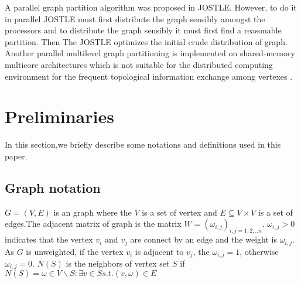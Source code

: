 \documentclass{acm_proc_article-sp}
\begin{document}
\par	
A parallel graph partition algorithm was proposed in JOSTLE. However, to do it in parallel JOSTLE must first distribute the graph sensibly amongst the processors and to distribute the graph sensibly it must first find a reasonable partition. Then The JOSTLE optimizes the initial crude distribution of graph. Another parallel multilevel graph partitioning is implemented on shared-memory multicore architectures which is not suitable for the distributed computing environment for the frequent topological information exchange among vertexes \cite{sui:parallel}.
\section{Preliminaries}
In this section,we briefly describe some notations and definitions used in this paper.
\par
\subsection{Graph notation}
$G=(V,E)$ is an graph where the $V$ is a set of vertex and $E \subseteq V \times V$ is a set of edges.The adjacent matrix of graph is the matrix $W=(\omega_{i,j})_{i,j=1,2,..n}$. $\omega_{i,j}>0$ indicates that the vertex $v_{i}$ and $v_{j}$ are connect by an edge and the weight is $\omega_{i,j}$. As $G$ is unweighted, if the vertex $v_{i}$ is adjacent to $v_{j}$, the $\omega_{i,j}=1$, otherwise $\omega_{i,j}=0$. $N(S)$ is the neighbors of vertex set $S$ if $N(S)={\omega\in V\backslash S:\exists v\in S s.t. (v,\omega)\in E}$
\end{document}
